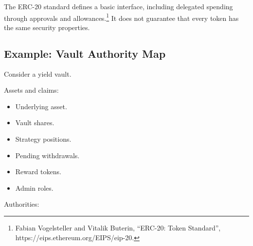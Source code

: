 The ERC-20 standard defines a basic interface, including delegated
spending through approvals and allowances.\footnote{Fabian Vogelsteller
  and Vitalik Buterin, ``ERC-20: Token Standard'',
  https://eips.ethereum.org/EIPS/eip-20.} It does not guarantee that
every token has the same security properties.

\subsection{Example: Vault Authority Map}

Consider a yield vault.

Assets and claims:

\begin{itemize}
\tightlist
\item
  Underlying asset.
\item
  Vault shares.
\item
  Strategy positions.
\item
  Pending withdrawals.
\item
  Reward tokens.
\item
  Admin roles.
\end{itemize}

Authorities:

